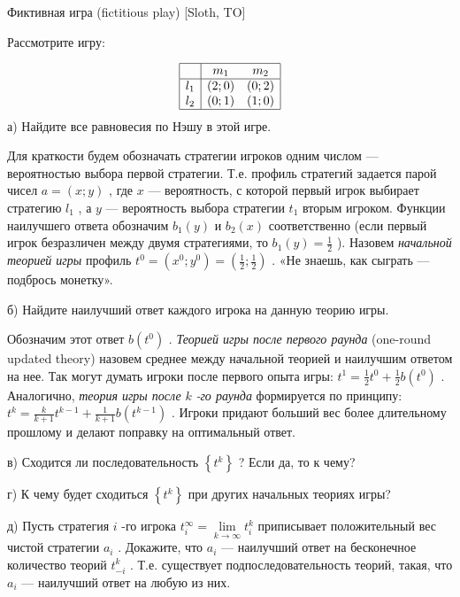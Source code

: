 \begin{problem}
 Фиктивная игра (fictitious play) [Sloth, TO]\par
Рассмотрите игру:

\[\begin{array}{|c|cc|}  \hline {} & {m_{1} } & {m_{2} } \\  \hline {l_{1} } & {\left(2;0\right)} & {\left(0;2\right)} \\ {l_{2} } & {\left(0;1\right)} & {\left(1;0\right)} \\  \hline  \end{array}\]
а) Найдите все равновесия по Нэшу в этой игре.\par
Для краткости будем обозначать стратегии игроков одним числом — вероятностью выбора первой стратегии. Т.е. профиль стратегий задается парой чисел  $a=\left(x;y\right)$ , где  $x$  — вероятность, с которой первый игрок выбирает стратегию  $l_{1} $ , а  $y$  — вероятность выбора стратегии  $t_{1} $  вторым игроком. Функции наилучшего ответа обозначим  $b_{1} \left(y\right)$  и  $b_{2} \left(x\right)$  соответственно (если первый игрок безразличен между двумя стратегиями, то  $b_{1} \left(y\right)=\frac{1}{2} $ ).
Назовем {\it начальной теорией игры} профиль  $t^{0} =\left(x^{0} ;y^{0} \right)=\left(\frac{1}{2} ;\frac{1}{2} \right)$ . «Не знаешь, как сыграть — подбрось монетку».\par
б) Найдите наилучший ответ каждого игрока на данную теорию игры.\par
Обозначим этот ответ  $b\left(t^{0} \right)$ . {\it Теорией игры после первого раунда} (one-round updated theory) назовем среднее между начальной теорией и наилучшим ответом на нее. Так могут думать игроки после первого опыта игры:  $t^{1} =\frac{1}{2} t^{0} +\frac{1}{2} b\left(t^{0} \right)$ . Аналогично, {\it теория игры после } $k$ {\it -го раунда} формируется по принципу:  $t^{k} =\frac{k}{k+1} t^{k-1} +\frac{1}{k+1} b\left(t^{k-1} \right)$ . Игроки придают больший вес более длительному прошлому и делают поправку на оптимальный ответ.\par
в) Сходится ли последовательность  $\left\{t^{k} \right\}$ ? Если да, то к чему?\par
г) К чему будет сходиться  $\left\{t^{k} \right\}$  при других начальных теориях игры?\par
д) Пусть стратегия  $i$ -го игрока  $t_{i}^{\infty } =\mathop{\lim }\limits_{k\to \infty } t_{i}^{k} $  приписывает положительный вес чистой стратегии  $a_{i} $ . Докажите, что  $a_{i} $  — наилучший ответ на бесконечное количество теорий  $t_{-i}^{k} $ . Т.е. существует подпоследовательность теорий, такая, что  $a_{i} $  — наилучший ответ на любую из них.\par

\end{problem}
